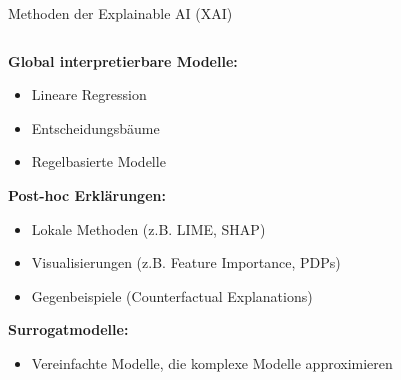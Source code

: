 \documentclass[aspectratio=1610, xcolor=dvipsnames, 9pt]{beamer}
\begin{document}
\begin{frame}{Methoden der Explainable AI (XAI)}
  \begin{columns}
    \begin{column}{1\textwidth}
      \textbf{Global interpretierbare Modelle:}
      \begin{itemize}
        \item Lineare Regression
        \item Entscheidungsbäume
        \item Regelbasierte Modelle
      \end{itemize}
      \vspace{0.5cm}
      \textbf{Post-hoc Erklärungen:}
      \begin{itemize}
        \item Lokale Methoden (z.B. LIME, SHAP)
        \item Visualisierungen (z.B. Feature Importance, PDPs)
        \item Gegenbeispiele (Counterfactual Explanations)
      \end{itemize}
      \vspace{0.5cm}
      \textbf{Surrogatmodelle:}
      \begin{itemize}
        \item Vereinfachte Modelle, die komplexe Modelle approximieren
      \end{itemize}
    \end{column}
  \end{columns}
\end{frame}
\end{document}
